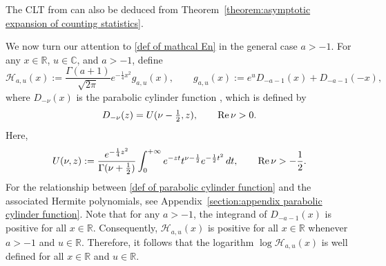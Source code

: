 \documentclass[reqno]{amsart}
\newcommand{\1}{\mathds{1}}
\newcommand{\C}{\mathds{C}}
\newcommand{\R}{\mathds{R}}
\newcommand{\re}{\text{\upshape Re\,}}
\numberwithin{equation}{section}
\theoremstyle{definition}
\begin{document}
The CLT from \cite[Proposition 2.13]{ABES2023} can also be deduced from Theorem~\ref{theorem:asymptotic expansion of counting statistics}.

\medskip
We now turn our attention to \eqref{def of mathcal En} in the general case $a>-1$.
For any $x\in\R$, $u\in\C$, and $a>-1$, define 
\begin{equation}
\label{def of cal H au}
\mathcal{H}_{a,u}(x):=\frac{\Gamma(a+1)}{\sqrt{2\pi}}e^{-\frac{1}{4}x^2}g_{a,u}(x),
    \qquad g_{a,u}(x):=
e^{u}D_{-a-1}(x)+D_{-a-1}(-x),
\end{equation}
where $D_{-\nu}(x)$ is the parabolic cylinder function \cite[Eq. (12.5.1)]{NIST}, which is defined by  
\begin{equation}
\label{def of parabolic cylinder function}
    D_{-\nu}(z)=U(\nu-\tfrac{1}{2},z),\qquad \re\nu>0. 
\end{equation}
Here,  
\begin{equation}
    U(\nu,z):=\frac{e^{-\frac{1}{4}z^2}}{\Gamma(\nu+\frac{1}{2})}
    \int_{0}^{+\infty}e^{-zt}t^{\nu-\frac{1}{2}}e^{-\frac{1}{2}t^2}\,dt,\qquad \re \nu>-\frac{1}{2}. 
\end{equation}
For the relationship between \eqref{def of parabolic cylinder function} and the associated Hermite polynomials, see Appendix~\ref{section:appendix parabolic cylinder function}. 
Note that for any $a>-1$, the integrand of $D_{-a-1}(x)$ is positive for all $x\in\R$.  
Consequently, $\mathcal{H}_{a,u}(x)$ is positive for all $x\in\R$ whenever $a>-1$ and $u\in\R$. 
Therefore, it follows that the logarithm $\log \mathcal{H}_{a,u}(x)$ is well defined for all $x\in\R$ and $u\in\R$.
\end{document}
